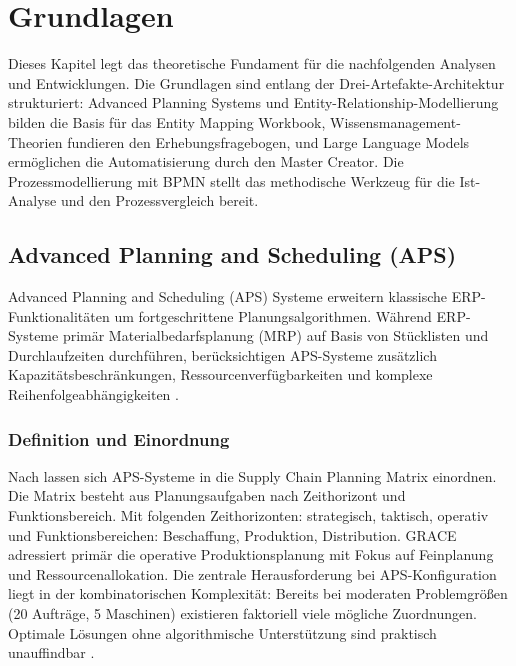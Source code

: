 \section{Grundlagen}
\label{sec:Grundlagen}


Dieses Kapitel legt das theoretische Fundament für die nachfolgenden Analysen und Entwicklungen. Die Grundlagen sind entlang der Drei-Artefakte-Architektur strukturiert: Advanced Planning Systems und Entity-Relationship-Modellierung bilden die Basis für das Entity Mapping Workbook, Wissensmanagement-Theorien fundieren den Erhebungsfragebogen, und Large Language Models ermöglichen die Automatisierung durch den Master Creator. Die Prozessmodellierung mit BPMN stellt das methodische Werkzeug für die Ist-Analyse und den Prozessvergleich bereit.

\subsection{Advanced Planning and Scheduling (APS)}
\label{sec:APS}

Advanced Planning and Scheduling (APS) Systeme erweitern klassische ERP-Funktionalitäten um fortgeschrittene Planungsalgorithmen. Während ERP-Systeme primär Materialbedarfsplanung (MRP) auf Basis von Stücklisten und Durchlaufzeiten durchführen, berücksichtigen APS-Systeme zusätzlich Kapazitätsbeschränkungen, Ressourcenverfügbarkeiten und komplexe Reihenfolgeabhängigkeiten \citep{stadtler:supply_chain_management2015}.

\subsubsection{Definition und Einordnung}
\label{subsubsec:APSDefinition}

Nach \cite{stadtler:supply_chain_management2015} lassen sich APS-Systeme in die Supply Chain Planning Matrix einordnen. Die Matrix besteht aus Planungsaufgaben nach Zeithorizont und Funktionsbereich. Mit folgenden Zeithorizonten: strategisch, taktisch, operativ und Funktionsbereichen: Beschaffung, Produktion, Distribution. GRACE adressiert primär die operative Produktionsplanung mit Fokus auf Feinplanung und Ressourcenallokation. Die zentrale Herausforderung bei APS-Konfiguration liegt in der kombinatorischen Komplexität: Bereits bei moderaten Problemgrößen (20 Aufträge, 5 Maschinen) existieren faktoriell viele mögliche Zuordnungen. Optimale Lösungen ohne algorithmische Unterstützung sind praktisch unauffindbar \citep{pinedo:scheduling2016}.

